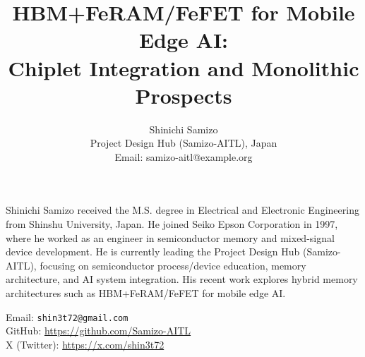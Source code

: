 \documentclass[10pt,conference]{IEEEtran}
\title{HBM+FeRAM/FeFET for Mobile Edge AI:\\
Chiplet Integration and Monolithic Prospects}
\author{
  Shinichi Samizo\\
  Project Design Hub (Samizo-AITL), Japan\\
  Email: samizo-aitl@example.org
}
\begin{document}
\maketitle










\begin{IEEEbiography}{Shinichi Samizo}
received the M.S. degree in Electrical and Electronic Engineering from Shinshu University, Japan.  
He joined Seiko Epson Corporation in 1997, where he worked as an engineer in semiconductor memory and mixed-signal device development.  
He is currently leading the Project Design Hub (Samizo-AITL), focusing on semiconductor process/device education, memory architecture, and AI system integration.  
His recent work explores hybrid memory architectures such as HBM+FeRAM/FeFET for mobile edge AI.  

Email: \texttt{shin3t72@gmail.com} \\
GitHub: \url{https://github.com/Samizo-AITL} \\
X (Twitter): \url{https://x.com/shin3t72}
\end{IEEEbiography}
\end{document}
